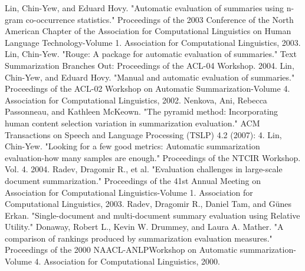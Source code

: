 \documentclass[twocolumn]{article}
\begin{document}
\begin{thebibliography}{8} %
     Lin, Chin-Yew, and Eduard Hovy. "Automatic evaluation of summaries using n-gram co-occurrence statistics." Proceedings of the 2003 Conference of the North American Chapter of the Association for Computational Linguistics on Human Language Technology-Volume 1. Association for Computational Linguistics, 2003.
     Lin, Chin-Yew. "Rouge: A package for automatic evaluation of summaries." Text Summarization Branches Out: Proceedings of the ACL-04 Workshop. 2004.
	Lin, Chin-Yew, and Eduard Hovy. "Manual and automatic evaluation of summaries." Proceedings of the ACL-02 Workshop on Automatic Summarization-Volume 4. Association for Computational Linguistics, 2002.
	Nenkova, Ani, Rebecca Passonneau, and Kathleen McKeown. "The pyramid method: Incorporating human content selection variation in summarization evaluation." ACM Transactions on Speech and Language Processing (TSLP) 4.2 (2007): 4.
	Lin, Chin-Yew. "Looking for a few good metrics: Automatic summarization evaluation-how many samples are enough." Proceedings of the NTCIR Workshop. Vol. 4. 2004.
	Radev, Dragomir R., et al. "Evaluation challenges in large-scale document summarization." Proceedings of the 41st Annual Meeting on Association for Computational Linguistics-Volume 1. Association for Computational Linguistics, 2003.
	Radev, Dragomir R., Daniel Tam, and Günes Erkan. "Single-document and multi-document summary evaluation using Relative Utility."
	Donaway, Robert L., Kevin W. Drummey, and Laura A. Mather. "A comparison of rankings produced by summarization evaluation measures." Proceedings of the 2000 NAACL-ANLPWorkshop on Automatic summarization-Volume 4. Association for Computational Linguistics, 2000.
\end{thebibliography}
\end{document}
